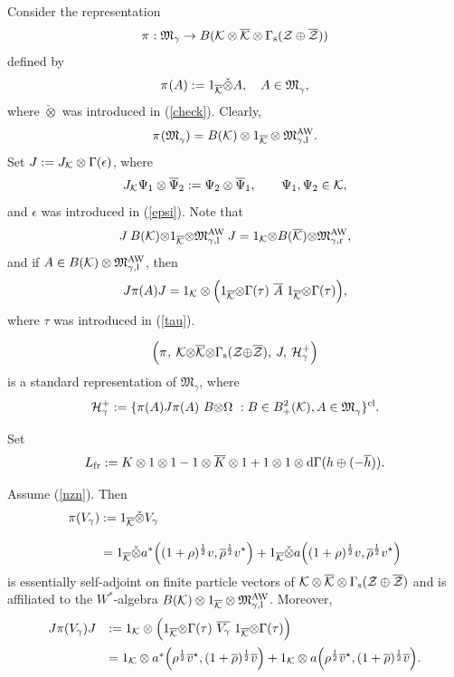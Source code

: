 \documentclass{svmult}
\def\AW{{\rm AW}}
\def\PF{{}}
\def\cl{{\rm cl}}
\def\bar{\overline}
\def\l{{\rm l}}
\def\r{{\rm r}}
\def\s{{\rm s}}
\def\12{{\frac12}}
\def\AW{{\rm AW}}
\def\cZ{{\cal Z}}
\def\cB{{ B}}
\def\fM{{\mathfrak M}}
\def\12{\frac{1}{2}}
\def\d{{\rm d}}
\def\one{{\bf 1}}
\def\cH{{\cal H}}
\def\l{{\rm l}}
\def\r{{\rm r}}
\def\cK{{\cal K}}
\def\12{\frac{1}{2}}
\def\d{{\rm d}}
\def\one{{ 1}}
\def\cH{{\cal H}}
\def\bep{\begin{proposition}}
\def\eep{\end{proposition}}
\def\fr{{\rm fr}}
\def\s{{\rm s}}
\begin{document}
\begin{remark}
Consider the  representation
\[\pi^{}
:\fM_{\gamma}\to 
\cB(\cK\otimes\bar\cK
\otimes\Gamma_\s(\cZ\oplus\bar\cZ))\]
defined by
\[\pi^{}(A):= 1_{\bar\cK}\check\otimes A,\ \ \  A\in
\fM_{\gamma}^\PF,\]
where $\check\otimes$ was introduced in  (\ref{check}).
Clearly, 
\[\pi^{}(\fM_{\gamma}^\PF)=\cB(\cK)\otimes1_{\bar\cK}\otimes
\fM_{\gamma,\l}^\AW.\]
Set $J:=J_\cK\otimes\Gamma(\epsilon)$, where
\begin{equation} J_\cK\Psi_1\otimes\bar{\Psi}_2:=
\Psi_2\otimes\bar{\Psi}_1,\qquad \Psi_1,\Psi_2\in\cK,
\label{jotk1}\end{equation}
 and $\epsilon$ was introduced in (\ref{epsi}).
Note that
\[J\:\cB(\cK){\otimes}1_{\bar\cK}{\otimes}\fM_{\gamma,\l}^\AW\:J=1_\cK{\otimes}
\cB(\bar\cK){\otimes}\fM_{\gamma,\r}^\AW,\]
and
 if $A \in \cB(\cK)\otimes\fM_{ \gamma,\l}^\AW$, then
\[J\pi(A)J=1_{\cK}\otimes\Big(
1_{\bar\cK}{\otimes}\Gamma(\tau)\ \bar{A}\ 1_{\bar\cK}{\otimes} 
\Gamma(\tau)\Big),\]
where $\tau$ was introduced in (\ref{tau}).

\bep
\[\Big(\pi^{},\: \cK{\otimes}\bar\cK{\otimes}
\Gamma_\s(\cZ{\oplus}\bar\cZ),\: J,\: 
\cH_\gamma^+\Big)\]
 is a standard representation
of $\fM_\gamma$, where
\[\cH_\gamma^+:=\{\pi(A)J\pi(A)\  B{\otimes}\Omega\ : B\in B^2_+(\cK),
A\in\fM_\gamma^\PF\}^\cl.\] 
\eep


Set
\[L_{\fr}:=K\otimes1\otimes1-1\otimes\bar
K\otimes1+1\otimes1\otimes\d\Gamma(h\oplus(-\bar h)).\]  

\bep Assume (\ref{nzn}). Then
\[\begin{split}
\pi(V_\gamma)&:=1_{\bar\cK}\check\otimes V_\gamma\\[3mm]
&=1_{\bar\cK}\check\otimes a^*\Big((1+\rho)^\12v,\bar\rho^\12 v^{\star}\Big)
+1_{\bar\cK}\check\otimes a\Big( (1+\rho)^\12 v, \bar\rho^\12v^{\star }\Big)
\end{split}\]
 is essentially self-adjoint on finite particle vectors of
$\cK \otimes \bar \cK 
\otimes \Gamma_{\s}(\cZ \oplus \bar \cZ)$ and is 
affiliated  to the $W^*$-algebra 
$B(\cK)\otimes\one_{\bar\cK}\otimes\fM_{ \gamma,\l}^\AW$. Moreover, 
\[\begin{array}{rl}
J\pi(V_\gamma) J&:=1_{\cK}\otimes \Big(
1_{\bar\cK}{\otimes}\Gamma(\tau)\ \bar{
V_\gamma}\ 1_{\bar\cK}{\otimes}\Gamma(\tau)\Big)\\[3mm]
&=1_{\cK}\otimes a^*\Big(\rho^\12\bar v^{\star},(1+\bar\rho)^\12 \bar v\Big)
+1_{\cK}\otimes
a\Big( \rho^\12\bar v^{\star}, (1+\bar\rho)^\12\bar v\Big)
.\end{array}\]
\eep


\end{remark}
\end{document}

